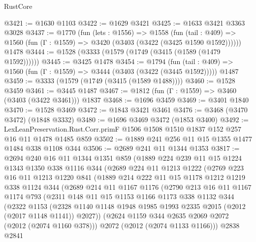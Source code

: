 \begin{lexlean}{RustCore}
\begin{coremodule}
@3421 := @1630 @1103
@3422 := @1629 @3421
@3425 := @1633 @3421 @3363 @3028
@3437 := @1770
    (fun (lets : @1556) =>
    @1558
      (fun (tail : @409) => @1560 (fun (Γ : @1559) => @3420 (@3403 (@3422 (@3425 @1590 @1592))))))
    @1478
@3444 := @1528 (@3333 (@1579 (@1749 (@3415 (@1589 (@1479 @1592))))))
@3445 := @3425 @1478
@3454 := @1794
    (fun (tail : @409) => @1560 (fun (Γ : @1559) => @3444 (@3403 (@3422 (@3445 @1592)))))
    @1487
@3459 := @3333 (@1579 (@1749 (@3415 (@1589 @1488))))
@3460 := @1528 @3459
@3461 := @3445 @1487
@3467 := @1812 (fun (Γ : @1559) => @3460 (@3403 (@3422 @3461))) @1837
@3468 := @1696 @3459
@3469 := @3401 @1840
@3470 := @1528 @3469
@3472 := @1843 @3421 @3461
@3476 := @3468 (@3470 @3472) (@1848 @3332)
@3480 := @1696 @3469 @3472 (@1853 @3400)
@3492 := LexLeanPreservation.Rust.Corr.primF
    @1506
    @1508
    @1510
    @1837
    @152
    @257
    @16
    @11
    @1478
    @1485
    @859
@3502 := @1889 @241 @256 @11 @15 @1355 @1477 @1484 @338 @1108 @344
@3506 := @2689 @241 @11 @1344 @1353
@3817 := @2694
    @240
    @16
    @11
    @1344
    @1351
    @859
    (@1889
      @224
      @239
      @11
      @15
      @1224
      @1343
      @1350
      @338
      @1116
      @344
      (@2689
        @224
        @11
        @1213
        @1222
        (@2769
          @223
          @16
          @11
          @1213
          @1220
          @841
          (@1889
            @214
            @222
            @11
            @15
            @1178
            @1212
            @1219
            @338
            @1124
            @344
            (@2689
              @214
              @11
              @1167
              @1176
              (@2790
                @213
                @16
                @11
                @1167
                @1174
                @793
                (@2311
                  @148
                  @11
                  @15
                  @1153
                  @1166
                  @1173
                  @338
                  @1132
                  @344
                  (@2322
                    @1153
                    (@2328
                      @1140
                      @1148
                      @1948
                      @1985
                      @1993
                      @2335
                      @2015
                      (@2012 (@2017 @1148 @1141))
                      @2027))
                  (@2624 @1159 @344 @2635 @2069 @2072 (@2012 (@2074 @1160 @378)))
                  @2072
                  (@2012 (@2074 @1133 @1166)))
                @2838
                @2841

\end{coremodule}
\end{lexlean}
